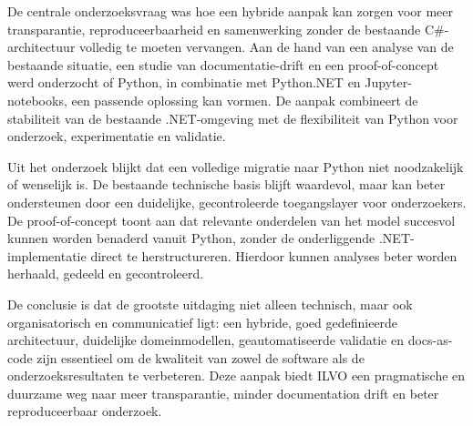 De centrale onderzoeksvraag was hoe een hybride aanpak kan zorgen voor meer transparantie, reproduceerbaarheid en samenwerking zonder de bestaande C\#-architectuur volledig te moeten vervangen. Aan de hand van een analyse van de bestaande situatie, een studie van documentatie-drift en een proof-of-concept werd onderzocht of Python, in combinatie met Python.NET en Jupyter-notebooks, een passende oplossing kan vormen. De aanpak combineert de stabiliteit van de bestaande .NET-omgeving met de flexibiliteit van Python voor onderzoek, experimentatie en validatie.

Uit het onderzoek blijkt dat een volledige migratie naar Python niet noodzakelijk of wenselijk is. De bestaande technische basis blijft waardevol, maar kan beter ondersteunen door een duidelijke, gecontroleerde toegangslayer voor onderzoekers. De proof-of-concept toont aan dat relevante onderdelen van het model succesvol kunnen worden benaderd vanuit Python, zonder de onderliggende .NET-implementatie direct te herstructureren. Hierdoor kunnen analyses beter worden herhaald, gedeeld en gecontroleerd.

De conclusie is dat de grootste uitdaging niet alleen technisch, maar ook organisatorisch en communicatief ligt: een hybride, goed gedefinieerde architectuur, duidelijke domeinmodellen, geautomatiseerde validatie en docs-as-code zijn essentieel om de kwaliteit van zowel de software als de onderzoeksresultaten te verbeteren. Deze aanpak biedt ILVO een pragmatische en duurzame weg naar meer transparantie, minder documentation drift en beter reproduceerbaar onderzoek.


